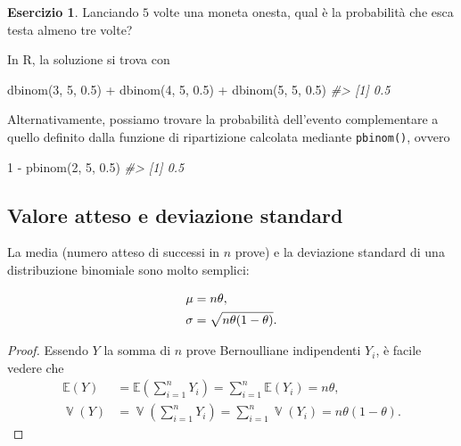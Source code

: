 \documentclass[
  11pt,
]{krantz}
\makeatletter
\newenvironment{Shaded}{\begin{snugshade}}{\end{snugshade}}
\newcommand{\CommentTok}[1]{\textcolor[rgb]{0.37,0.37,0.37}{\textit{#1}}}
\newcommand{\DecValTok}[1]{\textcolor[rgb]{0.06,0.06,0.06}{#1}}
\newcommand{\FloatTok}[1]{\textcolor[rgb]{0.06,0.06,0.06}{#1}}
\newcommand{\FunctionTok}[1]{\textcolor[rgb]{0,0,0}{#1}}
\newcommand{\NormalTok}[1]{#1}
\newcommand{\SpecialCharTok}[1]{\textcolor[rgb]{0,0,0}{#1}}
\newenvironment{kframe}{%
\medskip{}
\setlength{\fboxsep}{.8em}
 \def\at@end@of@kframe{}%
 \ifinner\ifhmode%
  \def\at@end@of@kframe{\end{minipage}}%
  \begin{minipage}{\columnwidth}%
 \fi\fi%
 \def\FrameCommand##1{\hskip\@totalleftmargin \hskip-\fboxsep
 \colorbox{shadecolor}{##1}\hskip-\fboxsep
     \hskip-\linewidth \hskip-\@totalleftmargin \hskip\columnwidth}%
 \MakeFramed {\advance\hsize-\width
   \@totalleftmargin\z@ \linewidth\hsize
   \@setminipage}}%
 {\par\unskip\endMakeFramed%
 \at@end@of@kframe}
\renewenvironment{Shaded}{\begin{kframe}}{\end{kframe}}
\newcommand{\E}{\mathbb{E}} %
\DeclareMathOperator{\Var}{\mathbb{V}} %
\newcommand{\R}{\textsf{R}} %
\theoremstyle{definition}
\theoremstyle{definition}
\theoremstyle{definition}
\newtheorem{exercise}{Esercizio}[chapter]
\theoremstyle{definition}
\theoremstyle{remark}
\makeatother
\begin{document}
\begin{exercise}

Lanciando \(5\) volte una moneta onesta, qual è la probabilità che esca testa almeno tre volte?

In \R, la soluzione si trova con

\begin{Shaded}
\begin{Highlighting}[]
\FunctionTok{dbinom}\NormalTok{(}\DecValTok{3}\NormalTok{, }\DecValTok{5}\NormalTok{, }\FloatTok{0.5}\NormalTok{) }\SpecialCharTok{+} \FunctionTok{dbinom}\NormalTok{(}\DecValTok{4}\NormalTok{, }\DecValTok{5}\NormalTok{, }\FloatTok{0.5}\NormalTok{) }\SpecialCharTok{+} \FunctionTok{dbinom}\NormalTok{(}\DecValTok{5}\NormalTok{, }\DecValTok{5}\NormalTok{, }\FloatTok{0.5}\NormalTok{)}
\CommentTok{\#\textgreater{} [1] 0.5}
\end{Highlighting}
\end{Shaded}

Alternativamente, possiamo trovare la probabilità dell'evento complementare a quello definito dalla funzione di ripartizione calcolata mediante \texttt{pbinom()}, ovvero

\begin{Shaded}
\begin{Highlighting}[]
\DecValTok{1} \SpecialCharTok{{-}} \FunctionTok{pbinom}\NormalTok{(}\DecValTok{2}\NormalTok{, }\DecValTok{5}\NormalTok{, }\FloatTok{0.5}\NormalTok{)}
\CommentTok{\#\textgreater{} [1] 0.5}
\end{Highlighting}
\end{Shaded}

\end{exercise}

\hypertarget{valore-atteso-e-deviazione-standard}{%
\subsection{Valore atteso e deviazione standard}\label{valore-atteso-e-deviazione-standard}}

La media (numero atteso di successi in \(n\) prove) e la deviazione standard di una distribuzione binomiale sono molto semplici:

\begin{align}
\mu    &= n\theta,  \notag \\
\sigma &= \sqrt{n\theta(1-\theta)}.
\end{align}

\begin{proof}
Essendo \(Y\) la somma di \(n\) prove Bernoulliane indipendenti \(Y_i\), è facile vedere che \begin{align}
\E(Y) &= \E \left( \sum_{i=1}^n Y_i \right) = \sum_{i=1}^n \E(Y_i) = n\theta, \\
\Var(Y) &= \Var \left( \sum_{i=1}^n Y_i \right) = \sum_{i=1}^n \Var(Y_i) = n \theta (1-\theta).
\end{align}
\end{proof}
\end{document}
